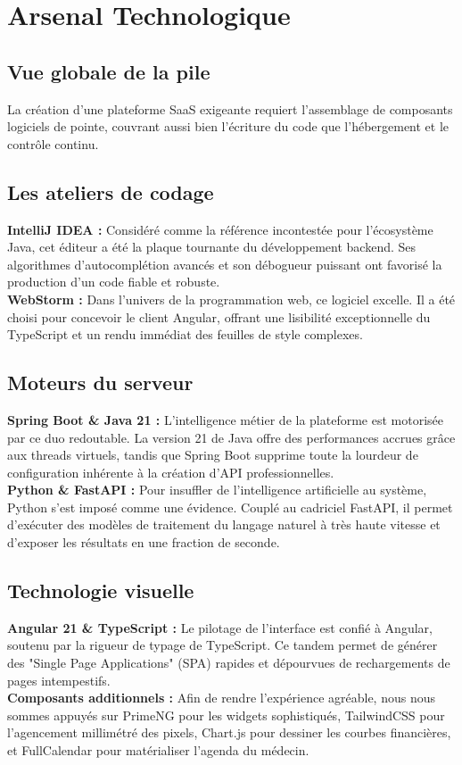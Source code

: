 \documentclass[final]{report}
\begin{document}
\section{Arsenal Technologique}
\subsection{Vue globale de la pile}
La création d'une plateforme SaaS exigeante requiert l'assemblage de composants logiciels de pointe, couvrant aussi bien l'écriture du code que l'hébergement et le contrôle continu.
 
\subsection{Les ateliers de codage}
\textbf{IntelliJ IDEA :} Considéré comme la référence incontestée pour l'écosystème Java, cet éditeur a été la plaque tournante du développement backend. Ses algorithmes d'autocomplétion avancés et son débogueur puissant ont favorisé la production d'un code fiable et robuste.\\
\textbf{WebStorm :} Dans l'univers de la programmation web, ce logiciel excelle. Il a été choisi pour concevoir le client Angular, offrant une lisibilité exceptionnelle du TypeScript et un rendu immédiat des feuilles de style complexes.
 
\subsection{Moteurs du serveur}
\textbf{Spring Boot \& Java 21 :} L'intelligence métier de la plateforme est motorisée par ce duo redoutable. La version 21 de Java offre des performances accrues grâce aux threads virtuels, tandis que Spring Boot supprime toute la lourdeur de configuration inhérente à la création d'API professionnelles.\\
\textbf{Python \& FastAPI :} Pour insuffler de l'intelligence artificielle au système, Python s'est imposé comme une évidence. Couplé au cadriciel FastAPI, il permet d'exécuter des modèles de traitement du langage naturel à très haute vitesse et d'exposer les résultats en une fraction de seconde.
 
\subsection{Technologie visuelle}
\textbf{Angular 21 \& TypeScript :} Le pilotage de l'interface est confié à Angular, soutenu par la rigueur de typage de TypeScript. Ce tandem permet de générer des "Single Page Applications" (SPA) rapides et dépourvues de rechargements de pages intempestifs.\\
\textbf{Composants additionnels :} Afin de rendre l'expérience agréable, nous nous sommes appuyés sur PrimeNG pour les widgets sophistiqués, TailwindCSS pour l'agencement millimétré des pixels, Chart.js pour dessiner les courbes financières, et FullCalendar pour matérialiser l'agenda du médecin.
 
\end{document}
